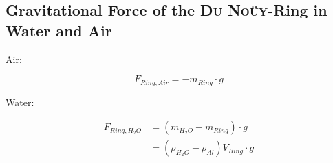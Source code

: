         \subsection{Gravitational Force of the \textsc{Du Noüy}-Ring in Water and Air}\label{sec:A3 gravi force of du noüy ring}%
            Air:

            \begin{equation}
                F_{Ring,Air} = -m_{Ring} \cdot g
            \end{equation}

            Water:

            \begin{align}
                F_{Ring,H_2O}  &= \left( m_{H_2O} - m_{Ring}\right) \cdot g \nonumber \\
                                &= \left(\rho_{H_2O} - \rho_{Al}\right)V_{Ring} \cdot g
            \end{align}
